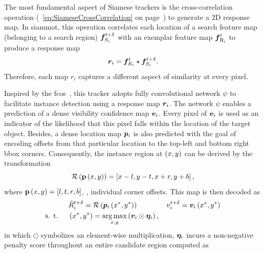 The most fundamental aspect of Siamese trackers is the cross-correlation operation (\sectiontext{}~\ref{eq:SiameseCrossCorrelation} on page~\pageref{eq:SiameseCrossCorrelation}) to generate a $2$D response map. In \gls{siammot}, this operation correlates each location of a search feature map (belonging to a search region) $\bm{f}_{S_i}^{t + \delta}$ with an exemplar feature map $\bm{f}_{R_i}^{t}$ to produce a response map
\begin{equation}
    \bm{r}_{i} = \bm{f}_{R_i}^{t} \star \bm{f}_{S_i}^{t + \delta}.
\end{equation}
Therefore, each map $r_i$ captures a different aspect of similarity at every pixel.

Inspired by the \gls{fcos}~\cite{tian2019fcos}, this tracker adopts fully convolutional network $\psi$ to facilitate instance detection using a response map $\bm{r}_{i}$. The network $\psi$ enables a prediction of a dense visibility confidence map $\bm{v}_{i}$. Every pixel of $\bm{v}_{i}$ is used as an indicator of the likelihood that this pixel falls within the location of the target object. Besides, a dense location map $\bm{p}_{i}$ is also predicted with the goal of encoding offsets from that particular location to the top-left and bottom right \gls{bbox} corners. Consequently, the instance region at $\left( {x, y} \right)$ can be derived by the transformation
\begin{equation}
    {\mathcal{R}} \left( {\mathbf{p}} \left( x, y \right) \right) =
    \left[ {x - l, y - t, x + r, y + b} \right],
\end{equation}
where ${\mathbf{p}} \left( x, y \right) = \left[ {l, t, r, b} \right]$, \ietext{}, individual corner offsets. This map is then decoded as
\begin{equation}
    \begin{aligned}
                            & {\tilde{R}}_{i}^{t + \delta} =
        {\mathcal{R}} \left( {\bm{p}_{i}} \left( x^*, y^* \right) \right)                                                                      \qquad \qquad
        {v}_{i}^{t + \delta} = {\bm{v}_{i}} \left( x^*, y^* \right)                                                              \\
        \text{s. t. } \quad & \left( {x^*, y^*} \right) = \underset{x, y}{\operatorname*{arg\,max}} \left( {\bm{v}_{i} \odot \bm{\eta}_{i}} \right),
    \end{aligned}
\end{equation}
in which $\odot$ symbolizes an element-wise multiplication, $\bm{\eta}_{i}$ incurs a non-negative penalty score throughout an entire candidate region computed as
